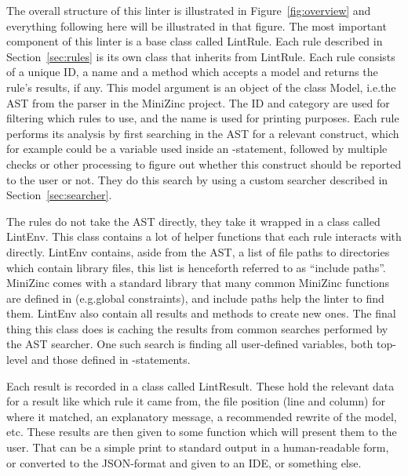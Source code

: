 \documentclass[a4paper,12pt]{article}
\newcommand{\mi}[1]{\mbox{\mzninline{#1}}}
\newcommand{\cpp}[1]{\mbox{\mznfont #1}}
\begin{document}
The overall structure of this linter is illustrated in Figure~\ref{fig:overview} and
everything following here will be illustrated in that figure. The most important component
of this linter is a base class called \cpp{LintRule}. Each rule described in
Section~\ref{sec:rules} is its own class that inherits from \cpp{LintRule}. Each rule
consists of a unique ID, %
a name and a method which accepts a model and returns the rule's results, if any.
This model argument is an object of the class \cpp{Model}, i.e.\@ the AST from the parser
in the MiniZinc project.
The ID and category are used for filtering which rules to use, and the name is used
for printing purposes. Each rule performs its analysis by first searching in the AST for a
relevant construct, which for example could be a variable used inside an
\mi{if}-statement, followed by multiple checks or other processing to figure out whether
this construct should be reported to the user or not. They do this search by using a
custom searcher described in Section~\ref{sec:searcher}.

\begin{sloppypar}
The rules do not take the AST directly, they take it wrapped in a class called
\cpp{LintEnv}. This class contains a lot of helper functions that each rule interacts with
directly. \cpp{LintEnv} contains, aside from the AST, a list of file paths
to directories which contain library files, this list is henceforth referred to as
``include paths''.
MiniZinc comes with a standard library that many
common MiniZinc functions are defined in (e.g.\@ global constraints), and include paths help the linter to find them.
\cpp{LintEnv} also contain all results and methods to create new ones. The final thing
this class does is caching the results from common searches performed by the AST searcher.
One such search is finding all user-defined
variables, both top-level and those defined in \mi{let}-statements.
\end{sloppypar}

Each result is recorded in a class called \cpp{LintResult}. These hold the relevant data
for a result like which rule it came from, the file position (line and column) for where it
matched, an explanatory message, a recommended rewrite of the model, etc. These results are
then given to some function which will present them to the user. That can be a simple
print to standard output in a human-readable form, or converted to the JSON-format and
given to an IDE, or something else.
\end{document}
